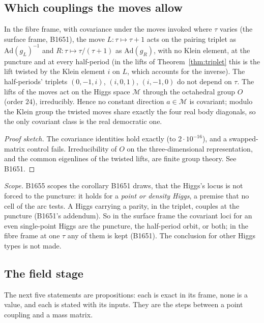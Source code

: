 \subsection{Which couplings the moves allow}\label{sec:t5}

\begin{theorem}[Covariance; T5]\label{thm:covariance}
In the fibre frame, with covariance under the moves invoked where $\tau$ varies (the surface frame, B1651), the move
$L:\tau\mapsto\tau+1$ acts on the pairing triplet as $\mathrm{Ad}(g_L)^{-1}$ and
$R:\tau\mapsto\tau/(\tau+1)$ as $\mathrm{Ad}(g_R)$, with no Klein element, at the puncture and at every half-period
(in the lifts of Theorem~\ref{thm:triplet} this is the lift twisted by the Klein element $i$ on $L$, which accounts for
the inverse). The
half-periods' triplets $(0,-1,i)$, $(i,0,1)$, $(i,-1,0)$ do not depend on $\tau$. The lifts of the moves act on the Higgs space $\mathcal M$ through the
octahedral group $O$ (order $24$), irreducibly. Hence no constant direction $a\in\mathcal M$ is covariant; modulo the
Klein group the twisted moves share exactly the four real body diagonals, so the only covariant class is the real
democratic one.
\end{theorem}
\begin{proof}[Proof sketch]
The covariance identities hold exactly (to $2\cdot10^{-16}$), and a swapped-matrix control fails. Irreducibility of $O$ on the three-dimensional representation, and the common eigenlines of the twisted lifts, are
finite group theory. See B1651.
\end{proof}
\noindent\emph{Scope.} B1655 scopes the corollary B1651 draws, that the Higgs's locus is not forced to the puncture: it
holds for a \emph{point or density Higgs}, a premise that no cell of the arc tests. A Higgs carrying
a parity, in the triplet, couples at the puncture (B1651's addendum). So in the surface frame the covariant loci for an even single-point
Higgs are the puncture, the half-period orbit, or both; in the fibre frame at one $\tau$ any of them is kept (B1651). The
conclusion for other Higgs types is not made.

\subsection{The field stage}\label{sec:field}

The next five statements are propositions: each is exact in its frame, none is a value, and each is stated with its
inputs. They are the steps between a point coupling and a mass matrix.

